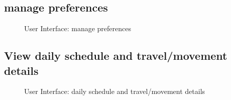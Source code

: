 \subsection{manage preferences}
\label{subsec:preferences}
\begin{figure}[!h]
	\centering
	\caption{User Interface: manage preferences}
\end{figure}
\clearpage

\subsection{View daily schedule and travel/movement details}
\label{subsec:dailySchedule}
\begin{figure}[!h]
	\centering
	\caption{User Interface: daily schedule and travel/movement details}
\end{figure}
\clearpage

